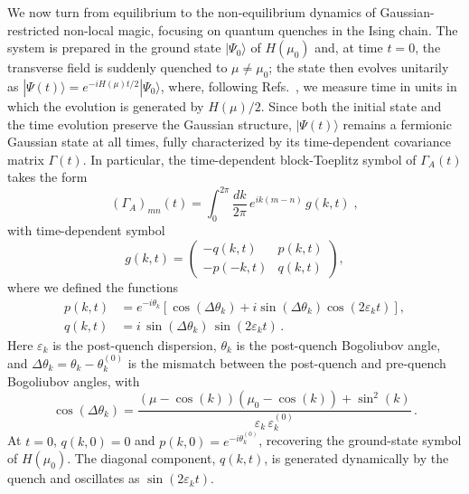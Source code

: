\documentclass[prx,twocolumn,superscriptaddress,aps,10pt, frontmatterverbose, reprint,footinbib,longbibliography=true]{revtex4-2}
\begin{document}
We now turn from equilibrium to the non-equilibrium dynamics of Gaussian-restricted non-local magic, focusing on quantum quenches in the Ising chain.
The system is prepared in the ground state $|\Psi_0\rangle$ of $H(\mu_0)$ and, at time $t=0$, the transverse field is suddenly quenched to $\mu \neq \mu_0$; the state then evolves unitarily as $|\Psi(t)\rangle = e^{-iH(\mu)t/2}|\Psi_0\rangle$, where, following Refs.~\cite{Calabrese2005evolution,Fagotti2008}, we measure time in units in which the evolution is generated by $H(\mu)/2$.
Since both the initial state and the time evolution preserve the Gaussian structure, $|\Psi(t)\rangle$ remains a fermionic Gaussian state at all times, fully characterized by its time-dependent covariance matrix $\Gamma(t)$.
In particular, the time-dependent block-Toeplitz symbol of $\Gamma_A(t)$ takes the form~\cite{Calabrese2005evolution}
\begin{equation}
    (\Gamma_A)_{mn}(t) = \int_0^{2\pi}\!\frac{dk}{2\pi}\,e^{ik(m-n)}\,g(k,t)\;,\label{eq:mustang}
\end{equation}
with time-dependent symbol
\begin{equation}
    g(k,t) = \begin{pmatrix} -q(k,t) & p(k,t) \\ -p(-k,t) & q(k,t) \end{pmatrix},
    \label{eq:symbol_t}
\end{equation}
where we defined the functions
\begin{equation}
\begin{split}
    p(k,t) &= e^{-i\theta_k}\left[\cos(\Delta\theta_k) + i\sin(\Delta\theta_k)\cos (2\varepsilon_k t) \right], \\
    q(k,t) &= i\,\sin(\Delta\theta_k)\,\sin (2\varepsilon_k t)\,.
    \label{eq:pq_symbol}
\end{split}
\end{equation}
Here $\varepsilon_k $ is the post-quench dispersion, $\theta_k$ is the post-quench Bogoliubov angle, and $\Delta\theta_k = \theta_k - \theta_k^{(0)}$ is the mismatch between the post-quench and pre-quench Bogoliubov angles, with
\begin{equation}
    \cos(\Delta\theta_k) = \frac{(\mu-\cos(k))(\mu_0-\cos (k))+\sin^2 (k)}{\varepsilon_k\,\varepsilon_k^{(0)}}\,.
    \label{eq:cos_delta_theta}
\end{equation}
At $t=0$, $q(k,0) = 0$ and $p(k,0) = e^{-i\theta_k^{(0)}}$, recovering the ground-state symbol of $H(\mu_0)$.
The diagonal component, $q(k,t)$, is generated dynamically by the quench and oscillates as $\sin(2\varepsilon_k t)$.
\end{document}

